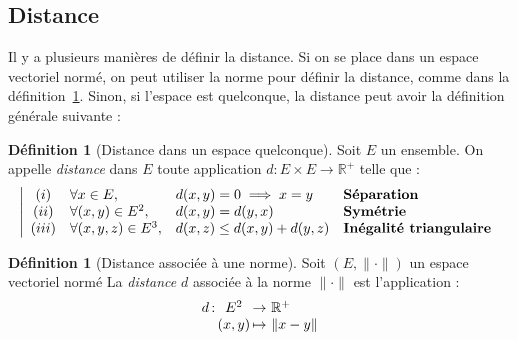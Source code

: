 \documentclass[11pt,a4paper]{report}
\theoremstyle{definition}
\newtheorem{dfn}[theorem]{Définition}
\begin{document}
\subsection{Distance} %
\label{sub:distance}
Il y a plusieurs manières de définir la distance. Si on se place dans un espace vectoriel normé, on peut utiliser la norme pour définir la distance, comme dans la définition~\ref{dfn:Distance_Norme}. Sinon, si l'espace est quelconque, la distance peut avoir la définition générale suivante : 
\begin{dfn}[Distance dans un espace quelconque]
Soit $E$ un ensemble. On appelle \emph{distance} dans $E$ toute application $d : E\times E \to \ensuremath{\mathbb{R}}^+$ telle que :
     \begin{equation}
        \left| 
        \begin{array}{c l l l}
        (i)&\forall x \in E,& d(x,y)=0 \implies x=y &\textbf{Séparation}\\
        (ii)&\forall (x,y) \in E^2,& d(x,y) = d(y,x) &\textbf{Symétrie}\\
        (iii)&\forall (x,y,z) \in E^3,& d(x,z)\le d(x,y)+d(y,z)&\textbf{Inégalité triangulaire}\\
        \end{array}
        \right.
        \end{equation}
\end{dfn}
\begin{dfn}[Distance associée à une norme]\label{dfn:Distance_Norme}
     Soit $(E,\| \cdot \|)$ un espace vectoriel normé\newline
     La \emph{distance} $d$ associée à la norme $\| \cdot \|$ est l'application :
     \begin{equation}
     \begin{array}{r @{\,}c@{\,} c @{\,}c@{\,} @{\,} l}
     d &: &E^2 &\to &\ensuremath{\mathbb{R}}^+ \\
        & &(x,y) &\mapsto & \| x - y \| 
        \end{array}
     \end{equation}
\end{dfn}

\end{document}
